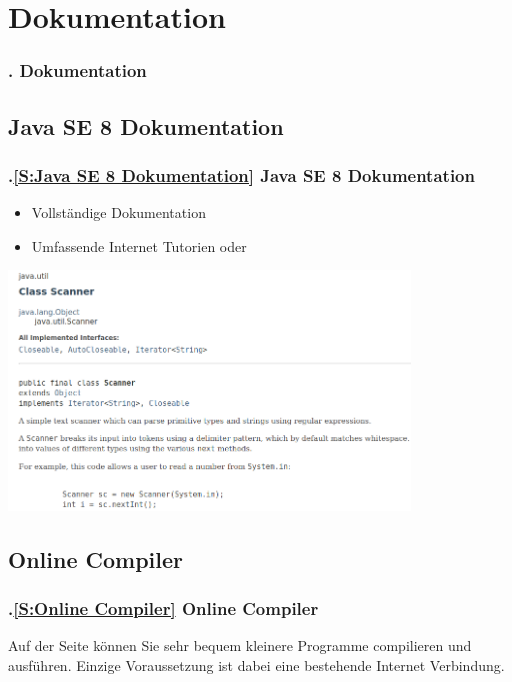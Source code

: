 \AtBeginSection{}
\section{Dokumentation}
\begin{frame}
  \frametitle{\kap. Dokumentation}%
\tableofcontents[current]
\end{frame}


\def\stitle{Java SE 8 Dokumentation}%
\subsection*{\stitle}\label{S:Java SE 8 Dokumentation}
\begin{frame}[t]%
  \frametitle{\kap.\ref{S:Java SE 8 Dokumentation} \stitle}%
\medskip

\begin{itemize}
\item Vollst\"andige Dokumentation 
\item Umfassende Internet Tutorien  oder 
\end{itemize}
\medskip

\includegraphics[width=0.8\textwidth]{javaDokumentation/java_small.png}
\end{frame}


\def\stitle{Online Compiler}%
\subsection*{\stitle}\label{S:Online Compiler}
\begin{frame}[t]%
  \frametitle{\kap.\ref{S:Online Compiler} \stitle}%
\medskip

Auf der Seite  k\"onnen Sie sehr bequem kleinere Programme compilieren und ausf\"uhren.
Einzige Voraussetzung ist dabei eine bestehende Internet Verbindung.
\end{frame}
